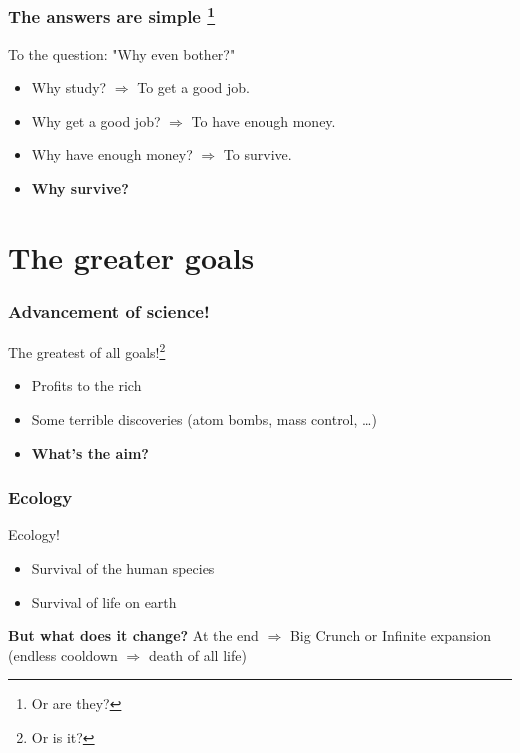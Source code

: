 \documentclass{beamer}
\begin{document}
    \begin{frame}
    	\frametitle{The answers are simple \footnote{Or are they?}}
    	
		To the question: "Why even bother?" \pause    		
		\begin{itemize}[<+->]
			\item Why study? $\Rightarrow$ To get a good job.
			\item Why get a good job? $\Rightarrow$ To have enough money.
			\item Why have enough money? $\Rightarrow$ To survive.
			\item \textbf{Why survive?}
		\end{itemize}		    		
    \end{frame}
    
	\section{The greater goals}    
    
    \begin{frame}
    		\frametitle{Advancement of science!}
    		
    		The greatest of all goals!\footnote{Or is it?} \pause
    		\begin{itemize}[<+->]
    			\item Profits to the rich
    			\item Some terrible discoveries (atom bombs, mass control, \dots)
    			\item \textbf{What's the aim?}
    		\end{itemize}
    \end{frame}
    
    \begin{frame}
    	\frametitle{Ecology}
    		
    	Ecology! \pause
    	\begin{itemize}[<+->]
    		\item Survival of the human species 
    		\item Survival of life on earth
    	\end{itemize}
    		
	\pause
    	\textbf{But what does it change?} At the end $\Rightarrow$ Big Crunch or Infinite expansion (endless cooldown $\Rightarrow$ death of all life)
    		
    		
    \end{frame}
    
\end{document}
